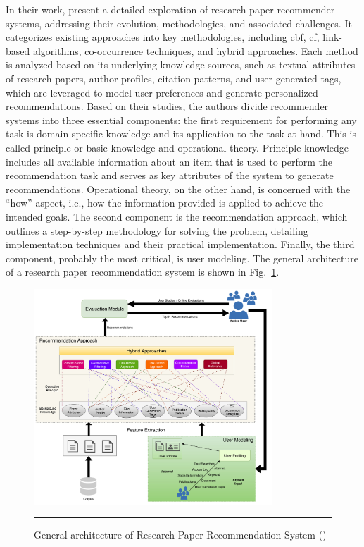 In their work, \textcite{Sharma2023} present a detailed exploration of research paper recommender systems, addressing their evolution, methodologies, and associated challenges.
It categorizes existing approaches into key methodologies, including \gls{cbf}, \gls{cf}, link-based algorithms, co-occurrence techniques, and hybrid approaches.
Each method is analyzed based on its underlying knowledge sources, such as textual attributes of research papers, author profiles, citation patterns, and user-generated tags, which are leveraged to model user preferences and generate personalized recommendations.
Based on their studies, the authors divide recommender systems into three essential components: the first requirement for performing any task is domain-specific knowledge and its application to the task at hand.
This is called principle or basic knowledge and operational theory.
Principle knowledge includes all available information about an item that is used to perform the recommendation task and serves as key attributes of the system to generate recommendations.
Operational theory, on the other hand, is concerned with the ``how'' aspect, i.e., how the information provided is applied to achieve the intended goals.
The second component is the recommendation approach, which outlines a step-by-step methodology for solving the problem, detailing implementation techniques and their practical implementation.
Finally, the third component, probably the most critical, is user modeling.
The general architecture of a research paper recommendation system is shown in Fig.~\ref{fig:general-architecture-rprs}.

\begin{figure}[htbp]
    \centering
 \includegraphics[width=0.8\textwidth]{figures/literature-review/general-architecture-rprs.png}
     \rule{35em}{0.5pt}
    \caption{General architecture of Research Paper Recommendation System (\textcite{Sharma2023})}
 \label{fig:general-architecture-rprs}
\end{figure}

